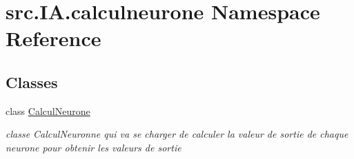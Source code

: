 \hypertarget{namespacesrc_1_1_i_a_1_1calculneurone}{}\section{src.\+I\+A.\+calculneurone Namespace Reference}
\label{namespacesrc_1_1_i_a_1_1calculneurone}
\subsection*{Classes}
\begin{DoxyCompactItemize}
\item 
class \hyperlink{classsrc_1_1_i_a_1_1calculneurone_1_1_calcul_neurone}{Calcul\+Neurone}
\begin{DoxyCompactList}\small\item\em classe Calcul\+Neuronne qui va se charger de calculer la valeur de sortie de chaque neurone pour obtenir les valeurs de sortie \end{DoxyCompactList}\end{DoxyCompactItemize}
